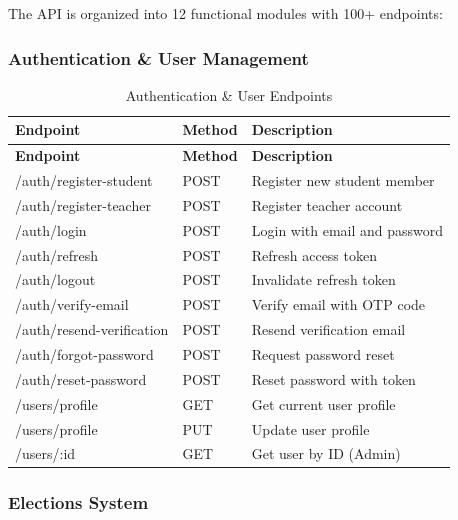 \documentclass[12pt,a4paper]{article}
\begin{document}
The API is organized into 12 functional modules with 100+ endpoints:

\subsubsection{Authentication \& User Management}

\begin{longtable}{>{\small\ttfamily}p{6.5cm}%
                  >{\small\centering\arraybackslash}p{1.3cm}%
                  >{\small}p{6.7cm}}
\caption{Authentication \& User Endpoints} \\

\rowcolor{Teal}
\color{white}\normalfont\bfseries Endpoint & \color{white}\bfseries Method & \color{white}\bfseries Description \\
\endfirsthead
\rowcolor{Teal}
\color{white}\normalfont\bfseries Endpoint & \color{white}\bfseries Method & \color{white}\bfseries Description \\
\endhead

\midrule
\rowcolor{LightTeal}/auth/register-student & POST & Register new student member \\
/auth/register-teacher & POST & Register teacher account \\
\rowcolor{LightTeal}/auth/login & POST & Login with email and password \\
/auth/refresh & POST & Refresh access token \\
\rowcolor{LightTeal}/auth/logout & POST & Invalidate refresh token \\
/auth/verify-email & POST & Verify email with OTP code \\
\rowcolor{LightTeal}/auth/resend-verification & POST & Resend verification email \\
/auth/forgot-password & POST & Request password reset \\
\rowcolor{LightTeal}/auth/reset-password & POST & Reset password with token \\
/users/profile & GET & Get current user profile \\
\rowcolor{LightTeal}/users/profile & PUT & Update user profile \\
/users/:id & GET & Get user by ID (Admin) \\
\bottomrule
\end{longtable}

\subsubsection{Elections System}
\end{document}
